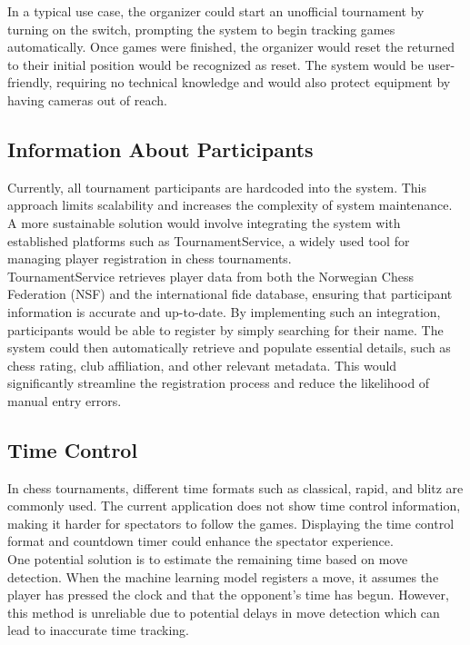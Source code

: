 In a typical use case, the organizer could start an unofficial tournament by turning on the switch, prompting the system to begin tracking games automatically. Once games were finished, the organizer would reset the returned to their initial position would be recognized as reset. The system would be user-friendly, requiring no technical knowledge and would also protect equipment by having cameras out of reach.

\subsection{Information About Participants}
Currently, all tournament participants are hardcoded into the system. This approach limits scalability and increases the complexity of system maintenance. A more sustainable solution would involve integrating the system with established platforms such as TournamentService, a widely used tool for managing player registration in chess tournaments. \\

TournamentService retrieves player data from both the Norwegian Chess Federation (NSF) and the international \gls{fide} database, ensuring that participant information is accurate and up-to-date.
By implementing such an integration, participants would be able to register by simply searching for their name. The system could then automatically retrieve and populate essential details, such as chess rating, club affiliation, and other relevant metadata. This would significantly streamline the registration process and reduce the likelihood of manual entry errors. \\

\subsection{Time Control}
In chess tournaments, different time formats such as \gls{classical}, \gls{rapid}, and \gls{blitz} are commonly used. The current application does not show time control information, making it harder for spectators to follow the games. Displaying the time control format and countdown timer could enhance the spectator experience. \\

One potential solution is to estimate the remaining time based on move detection. When the machine learning model registers a move, it assumes the player has pressed the clock and that the opponent’s time has begun. However, this method is unreliable due to potential delays in move detection which can lead to inaccurate time tracking. \\

